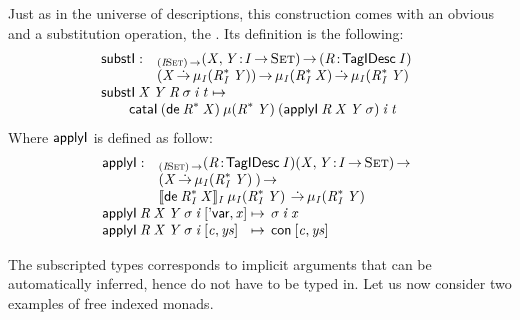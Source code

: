 \newcommand{\substI}{\F{substI}}


Just as in the universe of descriptions, this construction comes with
an obvious \return and a substitution operation, the \bind. Its
definition is the following:
%
\[\stk{
\begin{array}{@{}ll}
\substI : & _{\PI{\V{I}}{\Set}}
            \PI{\V{X}, \V{Y}}{\V{I} \To \Set}
            \PITEL{\V{R}}{\TagIDesc{\V{I}}} \\
          & (\V{X} \DotTo 
             \SYMBIMu_{\V{I}}{(\FreeIMonad{\V{R}}{\V{I}}{\V{Y}})}) \To 
            \SYMBIMu_{\V{I}}{(\FreeIMonad{\V{R}}{\V{I}}{\V{X}})} \DotTo
            \SYMBIMu_{\V{I}}{(\FreeIMonad{\V{R}}{\V{I}}{\V{Y}})}
\end{array} \\
\substI\: \V{X}\: \V{Y}\: \V{R}\: \V{\sigma}\: \V{i}\: \V{t} \mapsto \\
\qquad    \cataI\: (\toIDesc{\FreeIMonad{\V{R}}{}{\V{X}}})\:
                      \SYMBIMu{(\FreeIMonad{\V{R}}{}{\V{Y}})}\:
                      (\F{applyI}\: \V{R}\: \V{X}\: \V{Y}\: \V{\sigma})\:
                      \V{i}\:
                      \V{t} 
}\]
% 
Where  $\F{applyI}$ is defined as follow:
%
\[\stk{
\begin{array}{@{}ll}
\F{applyI} : & _{\PI{\V{I}}{\Set}}
            \PITEL{\V{R}}{\TagIDesc{\V{I}}}
            \PI{\V{X}, \V{Y}}{\V{I} \To \Set} \\
          & (\V{X} \DotTo \IMu{\V{I}}{(\FreeIMonad{\V{R}}{\V{I}}{\V{Y}})}{}) \To \\
          & \idescop{\toIDesc{\FreeIMonad{\V{R}}
                                         {\V{I}}
                                         {\V{X}}}}
                    {\V{I}}
                    {\IMu{\V{I}}{(\FreeIMonad{\V{R}}{\V{I}}{\V{Y}})}} \DotTo 
            \IMu{\V{I}}{(\FreeIMonad{\V{R}}{\V{I}}{\V{Y}})}{}
\end{array} \\
\begin{array}{@{}l@{\:\mapsto\:\:}l}
\F{applyI}\: \V{R}\: \V{X}\: \V{Y}\: \V{\sigma}\: \V{i}\: \pair{\SYMBDVar}{\V{x}}{}   & \V{\sigma}\: \V{i}\: \V{x}                   \\
\F{applyI}\: \V{R}\: \V{X}\: \V{Y}\: \V{\sigma}\: \V{i}\: \pair{\V{c}}{\V{ys}}{} & \Con{\pair{\V{c}}{\V{ys}}{}}
\end{array}
}\]
 
The subscripted types corresponds to implicit arguments that can be
automatically inferred, hence do not have to be typed in. Let us now
consider two examples of free indexed monads.


